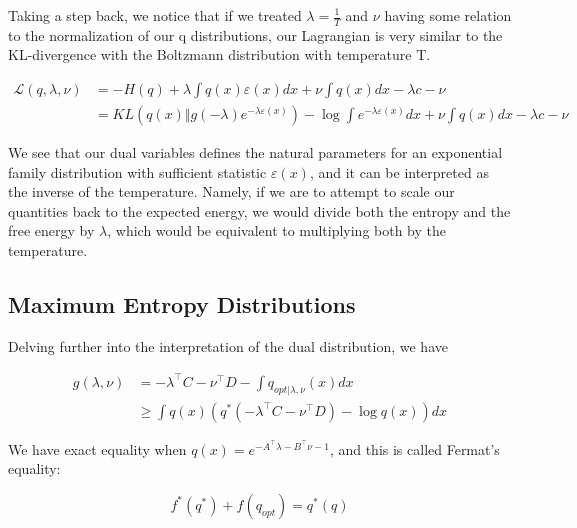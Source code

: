 \documentclass[a4paper]{article}
\begin{document}
Taking a step back, we notice that if we treated $\lambda = \frac{1}{T}$ and $\nu$ having some relation to the normalization of our q distributions, our Lagrangian is very similar to the KL-divergence with the Boltzmann distribution with temperature T.

\begin{equation}
  \begin{split}
    \mathcal{L}\left( q, \lambda,\nu \right) &= - H( q ) + \lambda \int q(x) \varepsilon(x) dx + \nu \int q(x) dx - \lambda c - \nu \\
    &= KL\left( q(x) \Vert g(-\lambda)e^{ -\lambda \varepsilon(x) } \right) - \log \int e^{ - \lambda \varepsilon(x) } dx + \nu \int q(x) dx - \lambda c - \nu
  \end{split}
  \label{}
\end{equation}

We see that our dual variables defines the natural parameters for an exponential family distribution with sufficient statistic $\varepsilon(x)$, and it can be interpreted as the inverse of the temperature.  Namely, if we are to attempt to scale our quantities back to the expected energy, we would divide both the entropy and the free energy by $\lambda$, which would be equivalent to multiplying both by the temperature.

\subsection{Maximum Entropy Distributions}

Delving further into the interpretation of the dual distribution, we have

\begin{equation}
  \begin{split}
    g(\lambda,\nu) &= - \lambda^\intercal C - \nu^\intercal D - \int q_{opt \vert \lambda, \nu}(x) dx \\
    &\geq \int q(x) \left( q^*( - \lambda^\intercal C - \nu^\intercal D ) - \log q(x) \right) dx
  \end{split}
  \label{}
\end{equation}

We have exact equality when $q(x) = e^{ - A^\intercal \lambda - B^\intercal \nu - 1}$, and this is called Fermat's equality:

\begin{equation}
  f^*(q^*) + f(q_{opt}) = q^*(q)
  \label{Fermat}
\end{equation}
\end{document}
